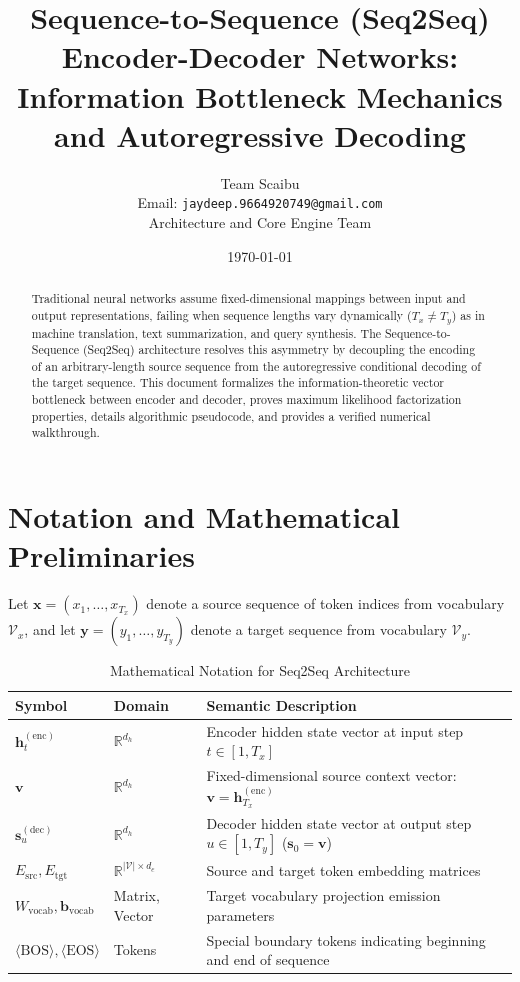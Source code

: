\documentclass[11pt,a4paper]{article}
\title{Sequence-to-Sequence (Seq2Seq) Encoder-Decoder Networks: Information Bottleneck Mechanics and Autoregressive Decoding}
\author{Team Scaibu \\ \small Email: \texttt{jaydeep.9664920749@gmail.com} \\ \small Architecture and Core Engine Team}
\date{\today}
\theoremstyle{definition}
\begin{document}
\maketitle

\begin{abstract}
Traditional neural networks assume fixed-dimensional mappings between input and output representations, failing when sequence lengths vary dynamically ($T_x \ne T_y$) as in machine translation, text summarization, and query synthesis. The Sequence-to-Sequence (Seq2Seq) architecture resolves this asymmetry by decoupling the encoding of an arbitrary-length source sequence from the autoregressive conditional decoding of the target sequence. This document formalizes the information-theoretic vector bottleneck between encoder and decoder, proves maximum likelihood factorization properties, details algorithmic pseudocode, and provides a verified numerical walkthrough.
\end{abstract}

\section{Notation and Mathematical Preliminaries}

Let $\mathbf{x} = (x_1, \dots, x_{T_x})$ denote a source sequence of token indices from vocabulary $\mathcal{V}_x$, and let $\mathbf{y} = (y_1, \dots, y_{T_y})$ denote a target sequence from vocabulary $\mathcal{V}_y$.

\begin{table}[h]
\centering
\caption{Mathematical Notation for Seq2Seq Architecture}
\begin{tabular}{lll}
\toprule
\textbf{Symbol} & \textbf{Domain} & \textbf{Semantic Description} \\
\midrule
$\mathbf{h}_t^{(\text{enc})}$ & $\mathbb{R}^{d_h}$ & Encoder hidden state vector at input step $t \in [1, T_x]$ \\
$\mathbf{v}$ & $\mathbb{R}^{d_h}$ & Fixed-dimensional source context vector: $\mathbf{v} = \mathbf{h}_{T_x}^{(\text{enc})}$ \\
$\mathbf{s}_u^{(\text{dec})}$ & $\mathbb{R}^{d_h}$ & Decoder hidden state vector at output step $u \in [1, T_y]$ ($\mathbf{s}_0 = \mathbf{v}$) \\
$E_{\text{src}}, E_{\text{tgt}}$ & $\mathbb{R}^{|\mathcal{V}| \times d_e}$ & Source and target token embedding matrices \\
$W_{\text{vocab}}, \mathbf{b}_{\text{vocab}}$ & Matrix, Vector & Target vocabulary projection emission parameters \\
$\langle \text{BOS} \rangle, \langle \text{EOS} \rangle$ & Tokens & Special boundary tokens indicating beginning and end of sequence \\
\bottomrule
\end{tabular}
\end{table}
\end{document}
